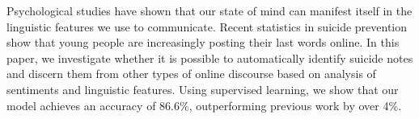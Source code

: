 Psychological studies have shown that our state of mind can manifest itself in the linguistic features we use to communicate. Recent statistics in suicide prevention show that young people are increasingly posting their last words online. In this paper, we investigate whether it is possible to automatically identify suicide notes and discern them from other types of online discourse based on analysis of sentiments and linguistic features. Using supervised learning, we show that our model achieves an accuracy of 86.6\%, outperforming previous work by over 4\%.
